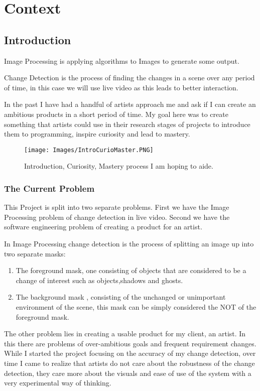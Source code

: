 \documentclass[a4paper]{report}
\begin{document}
\tableofcontents
\clearpage

\chapter{Context}
\section{Introduction}
Image Processing is applying algorithms to Images to generate some output.

Change Detection is the process of finding the changes in a scene over any period of time, in this case we will use live video as this leads to better interaction.

In the past I have had a handful of artists approach me and ask if I can create an ambitious products in a short period of time. My goal here was to create something that artists could use in their research stages of projects to introduce them to programming, inspire curiosity and lead to mastery.

\begin{figure}
\centering
\texttt{[image: Images/IntroCurioMaster.PNG]}
\caption{\label{fig:Introduction, Curiosity, Mastery process} Introduction, Curiosity, Mastery process I am hoping to aide.}
\end{figure}

\subsection{The Current Problem}
This Project is split into two separate problems. First we have the Image Processing problem of change detection in live video. Second we have the software engineering problem of creating a product for an artist.

In Image Processing change detection is the process of splitting an image up into two separate masks:
\begin{enumerate}
  \item The foreground mask, one consisting of objects that are considered to be a change of interest such as objects,shadows and ghosts.
  \item The background mask , consisting of the unchanged or unimportant environment of the scene, this mask can be simply considered the NOT of the foreground mask.
\end{enumerate}

The other problem lies in creating a usable product for my client, an artist. In this there are problems of over-ambitious goals and frequent requirement changes. While I started the project focusing on the accuracy of my change detection, over time I came to realize that artists do not care about the robustness of the change detection, they care more about the visuals and ease of use of the system with a very experimental way of thinking.
\end{document}
